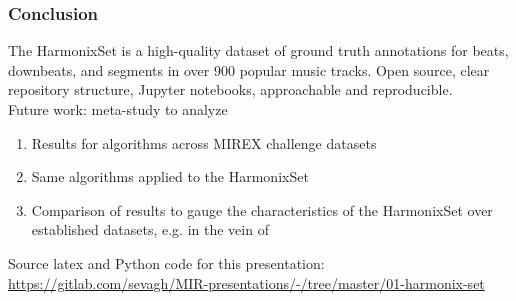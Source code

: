 \documentclass{beamer}
\begin{document}
\begin{frame}
	\frametitle{Conclusion}
	The HarmonixSet is a high-quality dataset of ground truth annotations for beats, downbeats, and segments in over 900 popular music tracks. Open source, clear repository structure, Jupyter notebooks, approachable and reproducible.\\
	\vspace{1em}
	Future work: meta-study to analyze
	\begin{enumerate}
		\item
			Results for algorithms across MIREX challenge datasets
		\item
			Same algorithms applied to the HarmonixSet
		\item
			Comparison of results to gauge the characteristics of the HarmonixSet over established datasets, e.g. in the vein of \cite{mazurkahard}
	\end{enumerate}
	\vspace{1em}
	Source latex and Python code for this presentation: \href{https://gitlab.com/sevagh/MIR-presentations/-/tree/master/01-harmonix-set}{https://gitlab.com/sevagh/MIR-presentations/-/tree/master/01-harmonix-set}
\end{frame}
\end{document}
